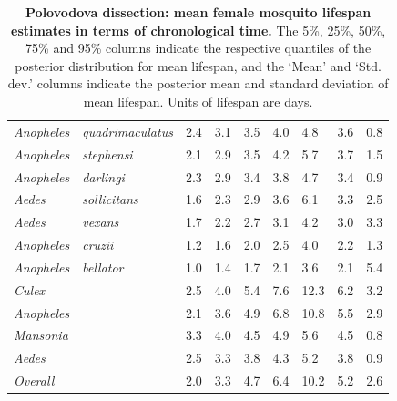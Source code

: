 \documentclass[12pt]{article}
\begin{document}
\begin{table}[htbp!]
\begin{tabular}{l|l|l|l|l|l|l|l|l}
		\textit{Anopheles} & \textit{quadrimaculatus} & 2.4 & 3.1 & 3.5 & 4.0 & 4.8 & 3.6 & 0.8 \\
		\textit{Anopheles} & \textit{stephensi} & 2.1 & 2.9 & 3.5 & 4.2 & 5.7 & 3.7 & 1.5 \\
		\textit{Anopheles} & \textit{darlingi} & 2.3 & 2.9 & 3.4 & 3.8 & 4.7 & 3.4 & 0.9 \\
		\textit{Aedes} & \textit{sollicitans} & 1.6 & 2.3 & 2.9 & 3.6 & 6.1 & 3.3 & 2.5 \\
		\textit{Aedes} & \textit{vexans} & 1.7 & 2.2 & 2.7 & 3.1 & 4.2 & 3.0 & 3.3 \\
		\textit{Anopheles} & \textit{cruzii} & 1.2 & 1.6 & 2.0 & 2.5 & 4.0 & 2.2 & 1.3 \\
		\textit{Anopheles} & \textit{bellator} & 1.0 & 1.4 & 1.7 & 2.1 & 3.6 & 2.1 & 5.4 \\
		\hline
		\textit{Culex} & \textit{} & 2.5 & 4.0 & 5.4 & 7.6 & 12.3 & 6.2 & 3.2 \\
		\textit{Anopheles} & \textit{} & 2.1 & 3.6 & 4.9 & 6.8 & 10.8 & 5.5 & 2.9 \\
		\textit{Mansonia} & \textit{} & 3.3 & 4.0 & 4.5 & 4.9 & 5.6 & 4.5 & 0.8 \\
		\textit{Aedes} & \textit{} & 2.5 & 3.3 & 3.8 & 4.3 & 5.2 & 3.8 & 0.9 \\
		\hline
		\textit{Overall} & \textit{} & 2.0 & 3.3 & 4.7 & 6.4 & 10.2 & 5.2 & 2.6 \\
	\end{tabular}
	\caption{\textbf{Polovodova dissection: mean female mosquito lifespan estimates in terms of chronological time.} The 5\%, 25\%, 50\%, 75\% and 95\% columns indicate the respective quantiles of the posterior distribution for mean lifespan, and the `Mean' and `Std. dev.' columns indicate the posterior mean and standard deviation of mean lifespan. Units of lifespan are days.}
	\label{tab:dissection_estimated_lifespans_chron}%
\end{table}
\end{document}
